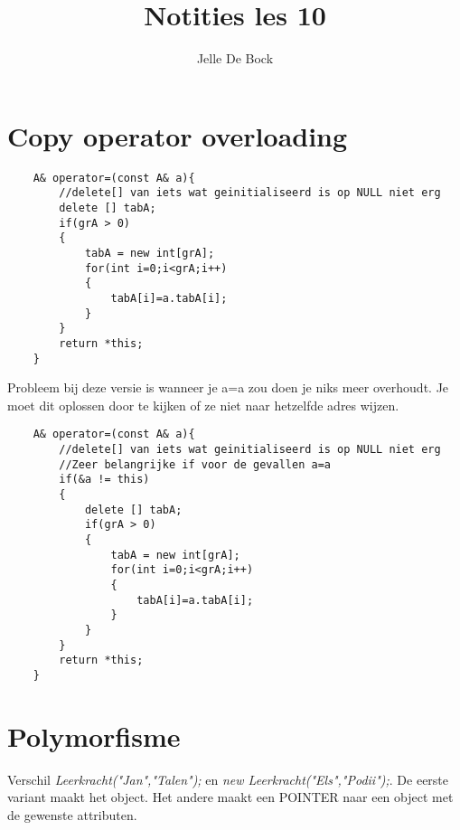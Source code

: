 \documentclass{article}
\title{Notities les 10}
\author{Jelle De Bock}
\begin{document}
\maketitle
\section{Copy operator overloading}
\begin{lstlisting}
    A& operator=(const A& a){
        //delete[] van iets wat geinitialiseerd is op NULL niet erg
        delete [] tabA;
        if(grA > 0)
        {
            tabA = new int[grA];
            for(int i=0;i<grA;i++)
            {
                tabA[i]=a.tabA[i];
            }
        }
        return *this;
    }
\end{lstlisting}
Probleem bij deze versie is wanneer je a=a zou doen je niks meer overhoudt.
Je moet dit oplossen door te kijken of ze niet naar hetzelfde adres wijzen.
\begin{lstlisting}
    A& operator=(const A& a){
        //delete[] van iets wat geinitialiseerd is op NULL niet erg
        //Zeer belangrijke if voor de gevallen a=a
        if(&a != this)
        {
            delete [] tabA;
            if(grA > 0)
            {
                tabA = new int[grA];
                for(int i=0;i<grA;i++)
                {
                    tabA[i]=a.tabA[i];
                }
            }
        }
        return *this;
    }
\end{lstlisting}
\section{Polymorfisme}
Verschil \textit{Leerkracht("Jan","Talen");}  en \textit{new
Leerkracht("Els","Podii");}. De
eerste variant maakt het object. Het andere maakt een POINTER naar een object
met de gewenste attributen.
\end{document}
